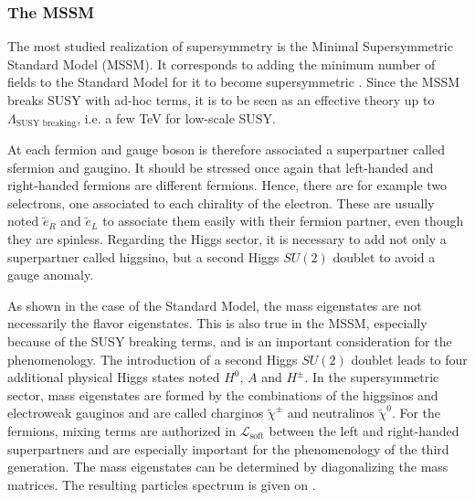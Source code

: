     \subsubsection{The MSSM}

    The most studied realization of supersymmetry is the Minimal Supersymmetric
    Standard Model (MSSM). It corresponds to adding the minimum number of fields
    to the Standard Model for it to become supersymmetric \cite{Dawson, Vempati,
    Romao}.  Since the MSSM breaks SUSY with ad-hoc terms, it is to be seen as
    an effective theory up to $\Lambda_{\text{SUSY breaking}}$, i.e. a few TeV
    for low-scale SUSY.

    At each fermion and gauge boson is therefore associated a superpartner
    called sfermion and gaugino. It should be stressed once again that
    left-handed and right-handed fermions are different fermions. Hence, there
    are for example two selectrons, one associated to each chirality of the
    electron. These are usually noted $\tilde{e}_R$ and $\tilde{e}_L$ to
    associate them easily with their fermion partner, even though they are
    spinless.  Regarding the Higgs sector, it is necessary to add not only a
    superpartner called higgsino, but a second Higgs $SU(2)$ doublet to avoid a
    gauge anomaly.

    As shown in the case of the Standard Model, the mass eigenstates are not
    necessarily the flavor eigenstates. This is also true in the MSSM,
    especially because of the SUSY breaking terms, and is an important
    consideration for the phenomenology. The introduction of a second Higgs
    $SU(2)$ doublet leads to four additional physical Higgs states noted $H^0$,
    $A$ and $H^\pm$.  In the supersymmetric sector, mass eigenstates are formed
    by the combinations of the higgsinos and electroweak gauginos and are called
    charginos $\tilde{\chi}^\pm$ and neutralinos $\tilde{\chi}^0$.  For the
    fermions, mixing terms are authorized in $\mathcal{L}_\text{soft}$ between
    the left and right-handed superpartners and are especially important for the
    phenomenology of the third generation. The mass eigenstates can be
    determined by diagonalizing the mass matrices. The resulting particles
    spectrum is given on .

